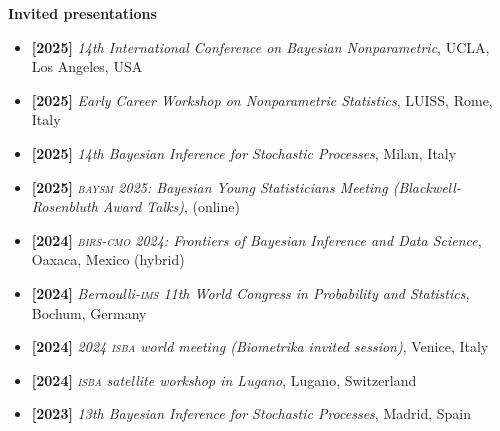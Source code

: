 \documentclass[10pt]{article}
\newenvironment{outerlist}[1][\enskip\tiny\textbullet]%
        {\begin{itemize}[#1]}{\end{itemize}%
         \vspace{-.6\baselineskip}}
\begin{document}
\textbf{Invited presentations}
\begin{outerlist}

\item[\textbf{[2025]}] \textsl{14th International Conference on Bayesian Nonparametric}, UCLA, Los Angeles, USA

\item[\textbf{[2025]}] \textsl{Early Career Workshop on Nonparametric Statistics}, LUISS, Rome, Italy

\item[\textbf{[2025]}] \textsl{14th Bayesian Inference for Stochastic Processes}, Milan, Italy

\item[\textbf{[2025]}] \textsl{\textsc{baysm} 2025: Bayesian Young Statisticians Meeting (Blackwell-Rosenbluth Award Talks)}, (online)

\item[\textbf{[2024]}] \textsl{\textsc{birs-cmo} 2024: Frontiers of Bayesian Inference and Data Science}, Oaxaca, Mexico (hybrid)

\item[\textbf{[2024]}] \textsl{Bernoulli-\textsc{ims} 11th World Congress in Probability and Statistics}, Bochum, Germany

\item[\textbf{[2024]}] \textsl{2024 \textsc{isba} world meeting (Biometrika invited session)}, Venice, Italy

\item[\textbf{[2024]}] \textsl{\textsc{isba} satellite workshop in Lugano}, Lugano, Switzerland

\item[\textbf{[2023]}] \textsl{13th Bayesian Inference for Stochastic Processes}, Madrid, Spain


\end{outerlist}
\end{document}
